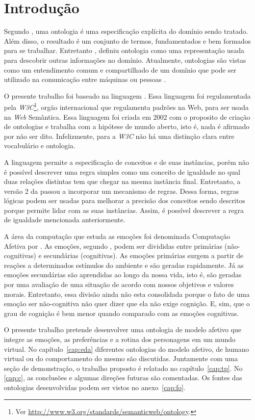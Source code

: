 \chapter{Introdução}

Segundo \citet{gruber1993translation}, uma ontologia é uma especificação
explícita do domínio sendo tratado. Além disso, o resultado é um conjunto de
termos, fundamentados e bem formados para se trabalhar. Entretanto
\citet{ontoly2004Approach}, definiu ontologia como uma representação usada
para descobrir outras informações no domínio. Atualmente, ontologias são
vistas como um entendimento comum e compartilhado de um domínio que pode ser
utilizado na comunicação entre máquinas ou pessoas \cite{wks2008towards}.

O presente trabalho foi baseado na linguagem \OWL. Essa linguagem foi
regulamentada pela \emph{W3C}\footnote{Ver
\url{http://www.w3.org/standards/semanticweb/ontology}.}, orgão internacional
que regulamenta padrões na Web, para ser usada na \emph{Web} Semântica. Essa
linguagem foi criada em 2002 com o proposito de criação de ontologias e
trabalha com a hipótese de mundo aberto, isto é, nada é afirmado por não ser
dito. Infelizmente, para a \emph{W3C} não há uma distinção clara entre vocabulário e
ontologia.

A linguagem \OWL permite a especificação de conceitos e de suas instâncias,
porém não é possível descrever uma regra simples como um conceito de igualdade
no qual duas relações distintas tem que chegar na mesma instância final.
%
Entretanto, a versão 2 da \OWL passou a incorporar um mecanismo de regras.
Dessa forma, regras lógicas podem ser usadas para melhorar a precisão dos
conceitos sendo descritos porque permite lidar com as suas instâncias. Assim,
é possível descrever a regra de igualdade mencionada anteriormente.

A área da computação que estuda as emoções foi denominada Computação Afetiva por
\citet{Pic98}. As emoções, segundo \citet{damasio2004erro}, podem ser divididas
entre primárias (não-cognitivas) e secundárias (cognitivas). As emoções
primárias surgem a partir de reações a determinados estímulos do ambiente e são
geradas rapidamente. Já as emoções secundárias são aprendidas ao longo da
nossa vida, isto é, são geradas por uma avaliação de uma situação de acordo
com nossos objetivos e valores morais. Entretanto, essa divisão ainda não esta
consolidada porque o fato de uma emoção ser não-cognitiva não quer dizer que
ela não exige cognição. E, sim, que o grau de cognição é bem menor quando
comparado com as emoções cognitivas.

O presente trabalho pretende desenvolver uma ontologia de modelo afetivo que
integre as emoções, as preferências e a rotina dos personagens em um mundo
virtual. No capítulo~\ref{cap:eda} diferentes ontologias do modelo afetivo, de
humano virtual ou do comportamento do mesmo são discutidas. Juntamente com uma
seção de demonstração, o trabalho proposto é relatado no
capítulo~\ref{cap:tp}. No \ref{cap:c}, as conclusões e algumas direções
futuras são comentadas.  Os fontes das ontologias desenvolvidas podem ser
vistos no anexo~\ref{cap:fo}.

